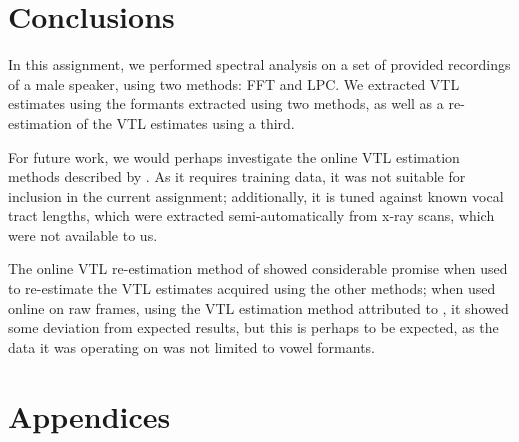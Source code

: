 \documentclass[11pt]{article}
\begin{document}
\section{Conclusions}

In this assignment, we performed spectral analysis on a set of provided recordings of a male speaker, using two methods: FFT and LPC. We extracted VTL estimates using the formants extracted using two methods, as well as a re-estimation of the VTL estimates using a third.

For future work, we would perhaps investigate the online VTL estimation methods described by \citet{lammert2015short}. As it requires training data, it was not suitable for inclusion in the current assignment; additionally, it is tuned against known vocal tract lengths, which were extracted semi-automatically from x-ray scans, which were not available to us.

The online VTL re-estimation method of \citet{rodriguez2010line} showed considerable promise when used to re-estimate the VTL estimates acquired using the other methods; when used online on raw frames, using the VTL estimation method attributed to \citet{necioglu2000unsupervised}, it showed some deviation from expected results, but this is perhaps to be expected, as the data it was operating on was not limited to vowel formants.




\section{Appendices}
\end{document}
